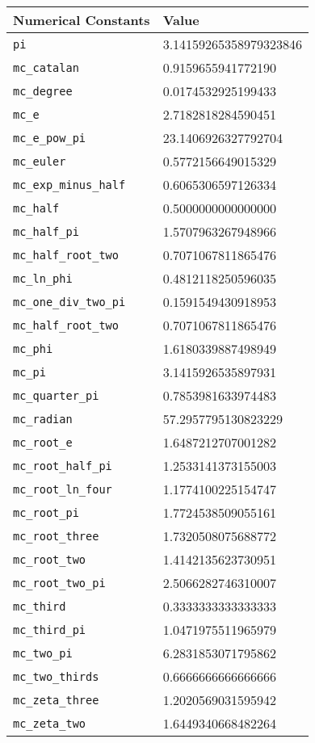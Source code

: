 \begin{tabular}{ll} \hline
Numerical Constants & Value  \\ \hline
{\tt pi} \index{pi}      & 3.14159265358979323846  \\
{\tt mc\_catalan} \index{mc\_catalan}  & 0.9159655941772190 \\
{\tt mc\_degree} \index{mc\_degree}  & 0.0174532925199433 \\
{\tt mc\_e} \index{mc\_e}  & 2.7182818284590451 \\
{\tt mc\_e\_pow\_pi} \index{mc\_e\_pow\_pi}  & 23.1406926327792704 \\
{\tt mc\_euler} \index{mc\_euler}  & 0.5772156649015329 \\
{\tt mc\_exp\_minus\_half} \index{mc\_exp\_minus\_half}  & 0.6065306597126334 \\
{\tt mc\_half} \index{mc\_half}  & 0.5000000000000000 \\
{\tt mc\_half\_pi} \index{mc\_half\_pi}  & 1.5707963267948966 \\
{\tt mc\_half\_root\_two} \index{mc\_half\_root\_two}  & 0.7071067811865476 \\
{\tt mc\_ln\_phi} \index{mc\_ln\_phi}  & 0.4812118250596035 \\
{\tt mc\_one\_div\_two\_pi} \index{mc\_one\_div\_two\_pi}  & 0.1591549430918953 \\
{\tt mc\_half\_root\_two} \index{mc\_half\_root\_two}  & 0.7071067811865476 \\
{\tt mc\_phi} \index{mc\_phi}  & 1.6180339887498949 \\
{\tt mc\_pi} \index{mc\_pi}  & 3.1415926535897931 \\
{\tt mc\_quarter\_pi} \index{mc\_quarter\_pi}  & 0.7853981633974483 \\
{\tt mc\_radian} \index{mc\_radian}  & 57.2957795130823229 \\
{\tt mc\_root\_e} \index{mc\_root\_e}  & 1.6487212707001282 \\
{\tt mc\_root\_half\_pi} \index{mc\_root\_half\_pi}  & 1.2533141373155003 \\
{\tt mc\_root\_ln\_four} \index{mc\_root\_ln\_four}  & 1.1774100225154747 \\
{\tt mc\_root\_pi} \index{mc\_root\_pi}  & 1.7724538509055161 \\
{\tt mc\_root\_three} \index{mc\_root\_three}  & 1.7320508075688772 \\
{\tt mc\_root\_two} \index{mc\_root\_two}  & 1.4142135623730951 \\
{\tt mc\_root\_two\_pi} \index{mc\_root\_two\_pi}  & 2.5066282746310007 \\
{\tt mc\_third} \index{mc\_third}  & 0.3333333333333333 \\
{\tt mc\_third\_pi} \index{mc\_third\_pi}  & 1.0471975511965979 \\
{\tt mc\_two\_pi} \index{mc\_two\_pi}  & 6.2831853071795862 \\
{\tt mc\_two\_thirds} \index{mc\_two\_thirds}  & 0.6666666666666666 \\
{\tt mc\_zeta\_three} \index{mc\_zeta\_three}  & 1.2020569031595942 \\
{\tt mc\_zeta\_two} \index{mc\_zeta\_two}  & 1.6449340668482264 \\
\end{tabular}
